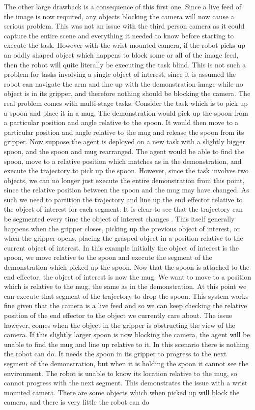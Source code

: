 The other large drawback is a consequence of this first one. Since a live feed of the image is now required, any objects blocking the camera will now cause a serious problem. This was not an issue with the third person camera as it could capture the entire scene and everything it needed to know before starting to execute the task. However with the wrist mounted camera, if the robot picks up an oddly shaped object which happens to block some or all of the image feed, then the robot will quite literally be executing the task blind. This is not such a problem for tasks involving a single object of interest, since it is assumed the robot can navigate the arm and line up with the demonstration image while no object is in its gripper, and therefore nothing should be blocking the camera. The real problem comes with multi-stage tasks.
Consider the task which is to pick up a spoon and place it in a mug. The demonstration would pick up the spoon from a particular position and angle relative to the spoon. It would then move to a particular position and angle relative to the mug and release the spoon from its gripper. Now suppose the agent is deployed on a new task with a slightly bigger spoon, and the spoon and mug rearranged. The agent would be able to find the spoon, move to a relative position which matches as in the demonstration, and execute the trajectory to pick up the spoon. However, since the task involves two objects, we can no longer just execute the entire demonstration from this point, since the relative position between the spoon and the mug may have changed. As such we need to partition the trajectory and line up the end effector relative to the object of interest for each segment. It is clear to see that the trajectory can be segmented every time the object of interest changes \cite{mimicgen}. This itself generally happens when the gripper closes, picking up the previous object of interest, or when the gripper opens, placing the grasped object in a position relative to the current object of interest. In this example initially the object of interest is the spoon, we move relative to the spoon and execute the segment of the demonstration which picked up the spoon. Now that the spoon is attached to the end effector, the object of interest is now the mug. We want to move to a position which is relative to the mug, the same as in the demonstration. At this point we can execute that segment of the trajectory to drop the spoon. This system works fine given that the camera is a live feed and so we can keep checking the relative position of the end effector to the object we currently care about. The issue however, comes when the object in the gripper is obstructing the view of the camera. If this slightly larger spoon is now blocking the camera, the agent will be unable to find the mug and line up relative to it. In this scenario there is nothing the robot can do. It needs the spoon in its gripper to progress to the next segment of the demonstration, but when it is holding the spoon it cannot see the environment. The robot is unable to know its location relative to the mug, so cannot progress with the next segment. This demonstrates the issue with a wrist mounted camera. There are some objects which when picked up will block the camera, and there is very little the robot can do 